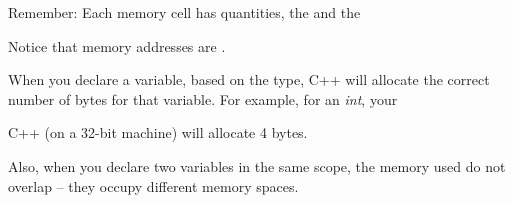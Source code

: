 Remember: Each memory cell has  quantities, the  and the 

Notice that memory addresses are .

When you declare a variable, based on the type, C++ will allocate the correct number of bytes for that variable. For example, for an \emph{int}, your

C++ (on a 32-bit machine) will allocate 4 bytes.

Also, when you declare two variables in the same scope, the memory used do not overlap -- they occupy different memory spaces.


